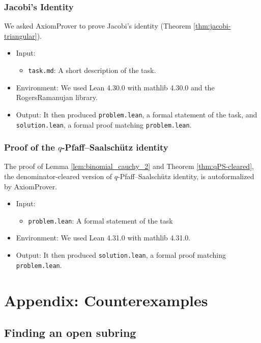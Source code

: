 \documentclass[12pt]{amsart}
\theoremstyle{definition}
\theoremstyle{remark}
\numberwithin{equation}{subsection}
\begin{document}
\subsubsection{Jacobi's Identity}

We asked AxiomProver to prove Jacobi's identity (Theorem \ref{thm:jacobi-triangular}).

\begin{itemize}
\item Input:
\begin{itemize}
\item \texttt{task.md}: A short description of the task.
\end{itemize}
\item Environment: We used Lean 4.30.0 with mathlib 4.30.0 and the RogersRamanujan library.
\item Output: It then produced \texttt{problem.lean}, a formal statement of the task, and \texttt{solution.lean}, a formal proof matching \texttt{problem.lean}.
\end{itemize}

\subsubsection{Proof of the $q$-Pfaff--Saalsch\"utz identity}

The proof of Lemma \ref{lem:binomial_cauchy_2} and Theorem \ref{thm:qPS-cleared}, the denominator-cleared version of $q$-Pfaff--Saalsch\"utz identity, is autoformalized by AxiomProver.
\begin{itemize}
    \item Input:
    \begin{itemize}
        \item \texttt{problem.lean}: A formal statement of the task
    \end{itemize}
    \item Environment: We used Lean 4.31.0 with mathlib 4.31.0.
    \item Output: It then produced \texttt{solution.lean}, a formal proof matching \texttt{problem.lean}.
\end{itemize}

\section{Appendix: Counterexamples}\label{sec:Counterexamples}

\subsection{Finding an open subring}\label{sec:strong-not-open}
\end{document}
